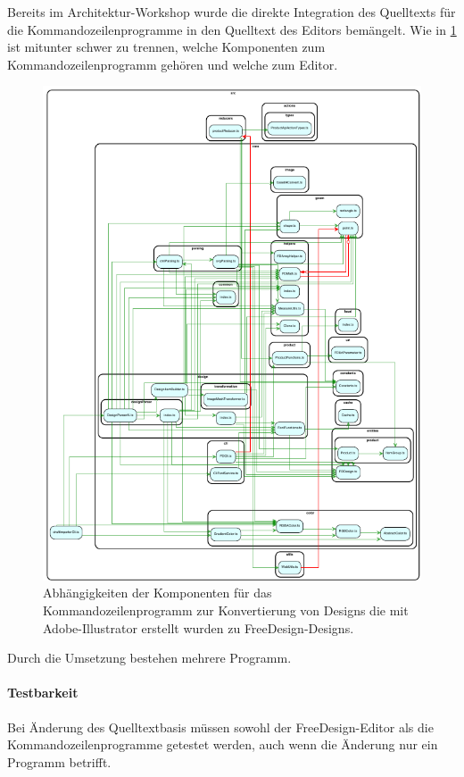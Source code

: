 Bereits im Architektur-Workshop wurde die direkte Integration des Quelltexts für die Kommandozeilenprogramme in den Quelltext des Editors bemängelt. 
Wie in \ref{fig:DesignImport} ist mitunter schwer zu trennen, welche Komponenten zum Kommandozeilenprogramm gehören und welche zum Editor. 
\begin{figure}[H]
    \centering
    \includegraphics{diagrams/Ist-Architektur/draftImporter-analysis.pdf}
    \caption{Abhängigkeiten der Komponenten für das Kommandozeilenprogramm zur Konvertierung von Designs die mit Adobe-Illustrator erstellt wurden zu FreeDesign-Designs.}
    \label{fig:DesignImport}
\end{figure}


Durch die Umsetzung bestehen mehrere Programm.
\paragraph{Testbarkeit} 
Bei Änderung des Quelltextbasis müssen sowohl der FreeDesign-Editor als die Kommandozeilenprogramme getestet werden, auch wenn die Änderung nur ein Programm betrifft.

